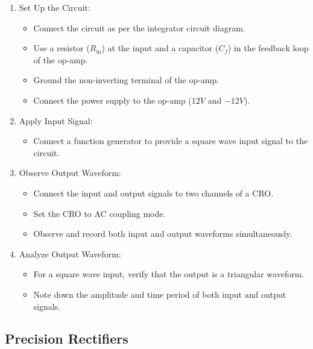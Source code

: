 \documentclass[journal]{IEEEtran}
\begin{document}
\begin{enumerate}
	\item Set Up the Circuit:
\begin{itemize}
	\item Connect the circuit as per the integrator circuit diagram.
	\item Use a resistor (\(R_{\text{in}}\)) at the input and a capacitor (\(C_f\)) in the feedback loop of the op-amp.
	\item Ground the non-inverting terminal of the op-amp.
	\item Connect the power supply to the op-amp (\(12V\) and \(-12V\)).
\end{itemize}

\item Apply Input Signal:
\begin{itemize}
	\item Connect a function generator to provide a square wave input signal to the circuit.
\end{itemize}

\item Observe Output Waveform:
\begin{itemize}
	\item Connect the input and output signals to two channels of a CRO.
	\item Set the CRO to AC coupling mode.
	\item Observe and record both input and output waveforms simultaneously.
\end{itemize}

\item Analyze Output Waveform:
\begin{itemize}
	\item For a square wave input, verify that the output is a triangular waveform.
	\item Note down the amplitude and time period of both input and output signals.
\end{itemize}

\end{enumerate}

	\subsection{Precision Rectifiers}
	
\end{document}
